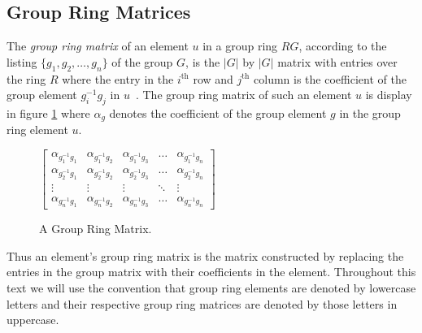 \subsection{Group Ring Matrices}
\label{sect:rgmatrices}
The \emph{group ring matrix} of an element $u$ in a group ring $RG$, according to the listing $\{g_1 , g_2 , \ldots , g_n \}$ of the group $G$, is the $|G|$ by $|G|$ matrix with entries over the ring $R$ where the entry in the $i^{\textrm{th}}$ row and $j^{\textrm{th}}$ column is the coefficient of the group element $g_i^{-1} g_j$ in $u$~\cite{hur07,hur09}.
The group ring matrix of such an element $u$ is display in figure \ref{fig:groupringmatrix} where $\alpha_g$ denotes the coefficient of the group element $g$ in the group ring element $u$.
\begin{figure}[htbp]
\begin{center}
$\left[\begin{array}{lllll}
\alpha_{g_1^{-1}g_1} & \alpha_{g_1^{-1}g_2} &\alpha_{g_1^{-1}g_3} 
 &  \ldots & \alpha_{g_1^{-1}g_n} \\

\alpha_{g_2^{-1}g_1} & \alpha_{g_2^{-1}g_2} &\alpha_{g_2^{-1}g_3} 
 &  \ldots & \alpha_{g_2^{-1}g_n} \\ 

\vdots & \vdots & \vdots &\ddots &\vdots \\

\alpha_{g_n^{-1}g_1} & \alpha_{g_n^{-1}g_2} &\alpha_{g_n^{-1}g_3} 
 &  \ldots & \alpha_{g_n^{-1}g_n} 
\end{array}\right] $
\caption{A Group Ring Matrix.}
\label{fig:groupringmatrix}
\end{center}
\end{figure}
Thus an element's group ring matrix is the matrix constructed by replacing the entries in the group matrix with their coefficients in the element.
Throughout this text we will use the convention that group ring elements are denoted by lowercase letters and their respective group ring matrices are denoted by those letters in uppercase.


